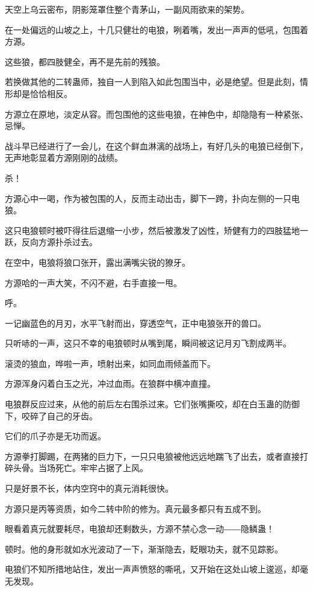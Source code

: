 
\begin{this_body}

天空上乌云密布，阴影笼罩住整个青茅山，一副风雨欲来的架势。

在一处偏远的山坡之上，十几只健壮的电狼，咧着嘴，发出一声声的低吼，包围着方源。

这些狼，都四肢健全，再不是先前的残狼。

若换做其他的二转蛊师，独自一人到陷入如此包围当中，必是绝望。但是此刻，情形却是恰恰相反。

方源立在原地，淡定从容。而包围他的这些电狼，在神色中，却隐隐有一种紧张、忌惮。

战斗早已经进行了一会儿，在这个鲜血淋漓的战场上，有好几头的电狼已经倒下，无声地彰显着方源刚刚的战绩。

杀！

方源心中一喝，作为被包围的人，反而主动出击，脚下一跨，扑向左侧的一只电狼。

这只电狼顿时被吓得往后退缩一小步，然后被激发了凶性，矫健有力的四肢猛地一跃，反向方源扑杀过去。

在空中，电狼将狼口张开，露出满嘴尖锐的獠牙。

方源哈的一声大笑，不闪不避，右手直接一甩。

呼。

一记幽蓝色的月刃，水平飞射而出，穿透空气，正中电狼张开的兽口。

只听哧的一声，这只不幸的电狼顿时从嘴到尾，瞬间被这记月刃飞割成两半。

滚烫的狼血，哗啦一声，喷射出来，如同血雨倾盖而下。

方源浑身闪着白玉之光，冲过血雨。在狼群中横冲直撞。

电狼群反应过来，从他的前后左右围杀过来。它们张嘴撕咬，却在白玉蛊的防御下，咬碎了自己的牙齿。

它们的爪子亦是无功而返。

方源拳打脚踢，在两猪的巨力下，一只只电狼被他远远地踹飞了出去，或者直接打碎头骨。当场死亡。牢牢占据了上风。

只是好景不长，体内空窍中的真元消耗很快。

方源只是丙等资质，如今二转中阶的修为。真元最多都只有五成不到。

眼看着真元就要耗尽，电狼却还剩数头，方源不禁心念一动――隐鳞蛊！

顿时。他的身形就如水光波动了一下，渐渐隐去，眨眼功夫，就不见踪影。

电狼们不知所措地站住，发出一声声愤怒的嘶吼，又开始在这处山坡上逡巡，却毫无发现。


\end{this_body}
